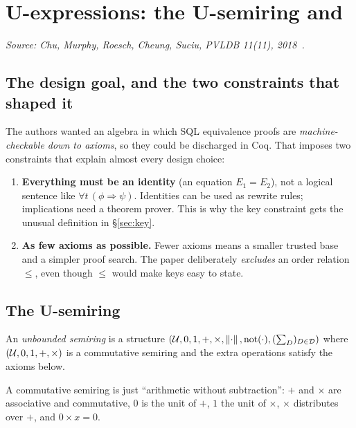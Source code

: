 \section{U-expressions: the U-semiring and \udp{}}
\label{sec:uexpr}

\emph{Source: Chu, Murphy, Roesch, Cheung, Suciu, PVLDB 11(11), 2018~\cite{udp}.}

\subsection{The design goal, and the two constraints that shaped it}

The authors wanted an algebra in which SQL equivalence proofs are \emph{machine-checkable
down to axioms}, so they could be discharged in Coq. That imposes two constraints that
explain almost every design choice:

\begin{enumerate}
\item \textbf{Everything must be an identity} (an equation $E_1 = E_2$), not a logical
      sentence like $\forall t\,(\phi \Rightarrow \psi)$. Identities can be used as rewrite
      rules; implications need a theorem prover. This is why the key constraint gets the
      unusual definition in \S\ref{sec:key}.
\item \textbf{As few axioms as possible.} Fewer axioms means a smaller trusted base and a
      simpler proof search. The paper deliberately \emph{excludes} an order relation
      $\le$, even though $\le$ would make keys easy to state.
\end{enumerate}

\subsection{The U-semiring}

\begin{definition}
An \emph{unbounded semiring} is a structure
$(\mathcal{U},0,1,+,\times,\left\lVert \cdot \right\rVert,\mathrm{not}(\cdot),(\sum_{D})_{D\in\mathcal D})$ where
$(\mathcal{U},0,1,+,\times)$ is a commutative semiring and the extra operations satisfy the
axioms below.
\end{definition}

A commutative semiring is just ``arithmetic without subtraction'': $+$ and $\times$ are
associative and commutative, $0$ is the unit of $+$, $1$ the unit of $\times$, $\times$
distributes over $+$, and $0 \times x = 0$.

